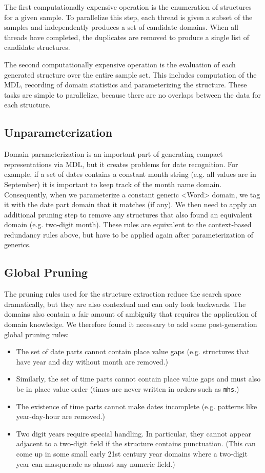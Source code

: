 The first computationally expensive operation is the enumeration of structures for a given sample. To parallelize this step, each thread is given a subset of the samples and independently produces a set of candidate domains. When all threads have completed, the duplicates are removed to produce a single list of candidate structures.

The second computationally expensive operation is the evaluation of each generated structure over the entire sample set. This includes computation of the MDL, recording of domain statistics and parameterizing the structure. These tasks are simple to parallelize, because there are no overlaps between the data for each structure.

\subsection{Unparameterization}
Domain parameterization is an important part of generating compact representations via MDL, but it creates problems for date recognition. For example, if a set of dates contains a constant month string (e.g. all values are in September) it is important to keep track of the month name domain. Consequently, when we parameterize a constant generic <Word> domain, we tag it with the date part domain that it matches (if any). We then need to apply an additional pruning step to remove any structures that also found an equivalent domain (e.g. two-digit month). These rules are equivalent to the context-based redundancy rules above, but have to be applied again after parameterization of generics.

\subsection{Global Pruning}
The pruning rules used for the structure extraction reduce the search space dramatically, but they are also contextual and can only look backwards. The domains also contain a fair amount of ambiguity that requires the application of domain knowledge. We therefore found it necessary to add some post-generation global pruning rules:
\begin{itemize}
\item The set of date parts cannot contain place value gaps (e.g. structures that have year and day without month are removed.)
\item Similarly, the set of time parts cannot contain place value gaps and must also be in place value order (times are never written in orders such as \texttt{mhs}.)
\item The existence of time parts cannot make dates incomplete (e.g. patterns like year-day-hour are removed.)
\item Two digit years require special handling. In particular, they cannot appear adjacent to a two-digit field if the structure contains punctuation. (This can come up in some small early 21st century year domains where a two-digit year can masquerade as almost any numeric field.)
\end{itemize}

